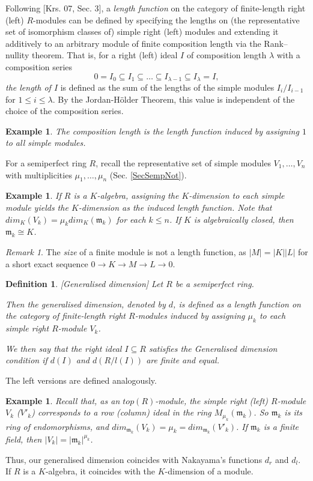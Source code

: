 \documentclass[11pt]{article}
\theoremstyle{plain}
\newtheorem{Ex}[veta]{Example}
\newtheorem{Def}[veta]{Definition}
\theoremstyle{remark}
\newtheorem*{remark}{Remark}
\theoremstyle{plain}
\newcommand{\m}{\mathfrak{m}}
\begin{document}
Following [Krs. 07, Sec. 3],  a \textit{length function} on the category of finite-length right (left) $R$-modules can be defined by specifying the lengths on (the representative set of isomorphism classes of) simple right (left) modules and extending it additively to an arbitrary module of finite composition length via the Rank–nullity theorem. That is, for a right (left) ideal $I$ of composition length $\lambda$ with a composition series
\[   0=I_0\subseteq I_1\subseteq \dots\subseteq  I_{\lambda-1}\subseteq I_\lambda=I,\]
 \textit{the length of $I$} is defined as the sum of the lengths of the simple modules $I_i/I_{i-1}$ for $1\leq i\leq \lambda$. By the Jordan-Hölder Theorem, this value is independent of the choice of the composition series.

\begin{Ex}
    The \textit{composition length} is the length function induced by assigning $1$ to all simple modules. 
    \end{Ex}
    For a semiperfect ring $R$, recall the representative set of simple modules  $V_1, \dots, V_n$ with multiplicities $\mu_1,\dots, \mu_n$ (Sec. \ref{SecSempNot}).
    \begin{Ex}
        If $R$ is a $K$-algebra, assigning the $K$-dimension to each simple module yields the $K$-dimension as the induced length function. Note that $dim_K(V_k)=\mu_k dim_K(\m_k)$ for each $k\leq n$. If $K$ is algebraically closed, then $\m_k\cong K$.
    \end{Ex}
\begin{remark}
       The \textit{size} of a finite module is not a length function, as $|M|=|K||L|$ for a short exact sequence $0\to K\to M\to L\to 0$.
\end{remark}
 


\begin{Def}\label{DefGenDim} [Generalised dimension]
    Let $R$ be a semiperfect ring.

    Then the \emph{generalised dimension}, denoted by $d$, is defined as a length function on the category of finite-length right $R$-modules induced by assigning $\mu_k$ to each simple right $R$-module $V_k$.

    We then say that the right ideal $I\subseteq R$  satisfies the \emph{Generalised dimension condition} if $d(I)$ and $d(R/l(I))$ are finite and equal.
    \end{Def}
    The left versions are defined analogously. 
\begin{Ex}\label{ExdimVk}
Recall that, as an $top(R)$-module, the simple right (left) $R$-module $V_k$ ($V'_k$) corresponds to a row (column) ideal in the ring $M_{\mu_k}(\m_k)$. So $\m_k$ is its ring of endomorphisms, and $dim_{\m_k}(V_k)=\mu_k=dim_{\m_k}(V'_k)$. If $\m_k$ is a finite field, then $|V_k|=|\m_k|^{\mu_k}$.
\end{Ex}
Thus, our generalised dimension coincides with Nakayama's functions $d_r$ and $d_l$. If $R$ is a $K$-algebra, it coincides with the $K$-dimension of a module. 
\end{document}
